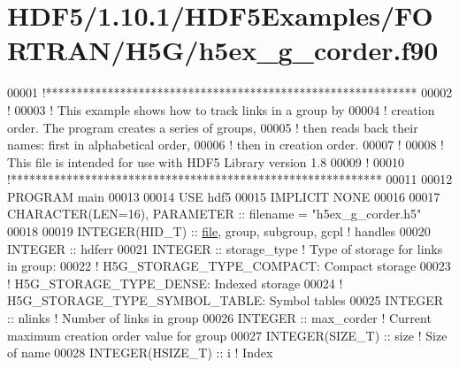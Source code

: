 \hypertarget{_h_d_f5_21_810_81_2_h_d_f5_examples_2_f_o_r_t_r_a_n_2_h5_g_2h5ex__g__corder_8f90_source}{}\section{H\+D\+F5/1.10.1/\+H\+D\+F5\+Examples/\+F\+O\+R\+T\+R\+A\+N/\+H5\+G/h5ex\+\_\+g\+\_\+corder.f90}
\label{_h_d_f5_21_810_81_2_h_d_f5_examples_2_f_o_r_t_r_a_n_2_h5_g_2h5ex__g__corder_8f90_source}

\begin{DoxyCode}
00001 \textcolor{comment}{!************************************************************}
00002 \textcolor{comment}{!}
00003 \textcolor{comment}{!  This example shows how to track links in a group by}
00004 \textcolor{comment}{!  creation order.  The program creates a series of groups,}
00005 \textcolor{comment}{!  then reads back their names: first in alphabetical order,}
00006 \textcolor{comment}{!  then in creation order.}
00007 \textcolor{comment}{!}
00008 \textcolor{comment}{!  This file is intended for use with HDF5 Library version 1.8}
00009 \textcolor{comment}{!}
00010 \textcolor{comment}{!************************************************************}
00011 
00012 \textcolor{keyword}{PROGRAM} main
00013 
00014   \textcolor{keywordtype}{USE }hdf5
00015   \textcolor{keywordtype}{IMPLICIT NONE}
00016 
00017   \textcolor{keywordtype}{CHARACTER(LEN=16)}, \textcolor{keywordtype}{PARAMETER} :: filename   = \textcolor{stringliteral}{"h5ex\_g\_corder.h5"}
00018 
00019   \textcolor{keywordtype}{INTEGER(HID\_T)} :: \hyperlink{structfile}{file}, group, subgroup, gcpl \textcolor{comment}{! handles}
00020   \textcolor{keywordtype}{INTEGER} :: hdferr
00021   \textcolor{keywordtype}{INTEGER} :: storage\_type \textcolor{comment}{! Type of storage for links in group:}
00022                           \textcolor{comment}{!   H5G\_STORAGE\_TYPE\_COMPACT: Compact storage}
00023                           \textcolor{comment}{!   H5G\_STORAGE\_TYPE\_DENSE: Indexed storage}
00024                           \textcolor{comment}{!   H5G\_STORAGE\_TYPE\_SYMBOL\_TABLE: Symbol tables}
00025   \textcolor{keywordtype}{INTEGER} :: nlinks       \textcolor{comment}{! Number of links in group}
00026   \textcolor{keywordtype}{INTEGER} :: max\_corder   \textcolor{comment}{! Current maximum creation order value for group }
00027   \textcolor{keywordtype}{INTEGER(SIZE\_T)} :: size  \textcolor{comment}{! Size of name}
00028   \textcolor{keywordtype}{INTEGER(HSIZE\_T)} :: i     \textcolor{comment}{! Index}

\end{DoxyCode}
